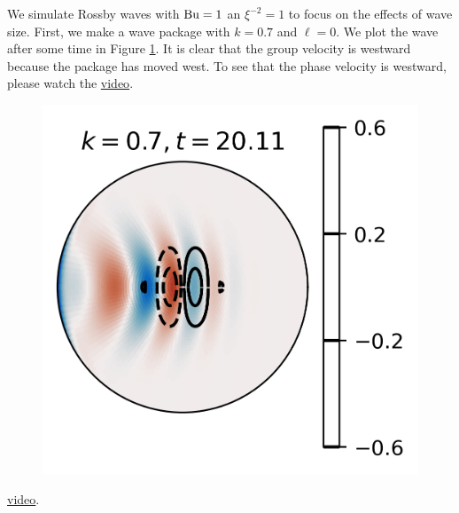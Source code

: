 We simulate Rossby waves with $\text{Bu}=1$ an $\xi^{-2}=1$ to focus on the effects of wave size. First, we make a wave package with $k=0.7$ and $\ell=0$. We plot the wave after some time in Figure \ref{fig:Rossby_k0d7_tt20d11}. It is clear that the group velocity is westward because the package has moved west. To see that the phase velocity is westward, please watch the \href{https://vimeo.com/936333986}{video}. 

\begin{figure}
    \centering
    \includegraphics{Rossby_plots/Rossby_k0d7_tt20d11}
    \caption{}
    \label{fig:Rossby_k0d7_tt20d11}
\end{figure}

\href{https://vimeo.com/936333886}{video}. 


